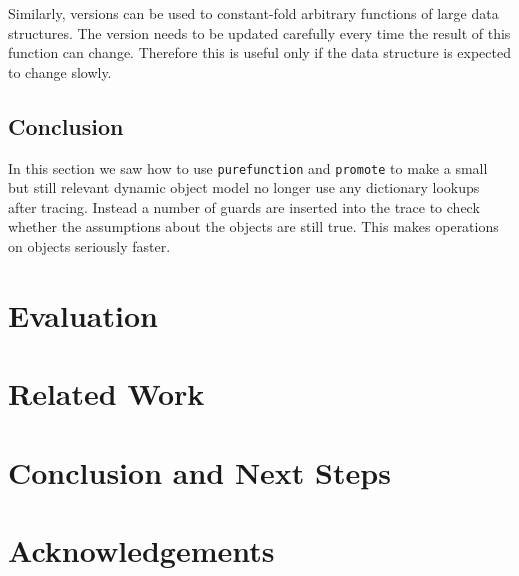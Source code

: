 \documentclass{sig-alternate}
\begin{document}
Similarly, versions can be used to constant-fold arbitrary functions of large data
structures. The version needs to be updated carefully every time the result of
this function can change. Therefore this is useful only if the data structure is
expected to change slowly.



\subsection{Conclusion}

In this section we saw how to use \texttt{purefunction} and \texttt{promote} to make a
small but still relevant dynamic object model no longer use any dictionary lookups
after tracing. Instead a number of guards are inserted into the
trace to check whether the assumptions about the objects are still true. This
makes operations on objects seriously faster.

\section{Evaluation}
\label{sec:evaluation}

\section{Related Work}

\section{Conclusion and Next Steps}

\section*{Acknowledgements}



\end{document}
